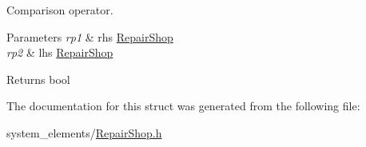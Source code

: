 Comparison operator.


\begin{DoxyParams}{Parameters}
{\em rp1} & rhs \mbox{\hyperlink{classRepairShop}{Repair\+Shop}} \\
\hline
{\em rp2} & lhs \mbox{\hyperlink{classRepairShop}{Repair\+Shop}} \\
\hline
\end{DoxyParams}
\begin{DoxyReturn}{Returns}
bool 
\end{DoxyReturn}


The documentation for this struct was generated from the following file\+:\begin{DoxyCompactItemize}
\item 
system\+\_\+elements/\mbox{\hyperlink{RepairShop_8h}{Repair\+Shop.\+h}}\end{DoxyCompactItemize}
